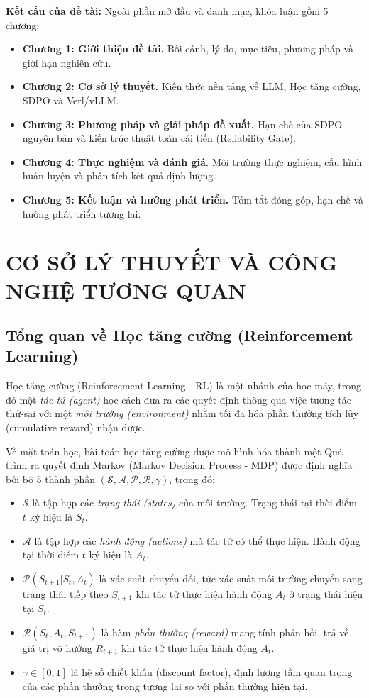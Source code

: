 \documentclass[12pt,a4paper]{report}
\begin{document}
\textbf{Kết cấu của đề tài:}
Ngoài phần mở đầu và danh mục, khóa luận gồm 5 chương:
\begin{itemize}
    \item \textbf{Chương 1: Giới thiệu đề tài.} Bối cảnh, lý do, mục tiêu, phương pháp và giới hạn nghiên cứu.
    \item \textbf{Chương 2: Cơ sở lý thuyết.} Kiến thức nền tảng về LLM, Học tăng cường, SDPO và Verl/vLLM.
    \item \textbf{Chương 3: Phương pháp và giải pháp đề xuất.} Hạn chế của SDPO nguyên bản và kiến trúc thuật toán cải tiến (Reliability Gate).
    \item \textbf{Chương 4: Thực nghiệm và đánh giá.} Môi trường thực nghiệm, cấu hình huấn luyện và phân tích kết quả định lượng.
    \item \textbf{Chương 5: Kết luận và hướng phát triển.} Tóm tắt đóng góp, hạn chế và hướng phát triển tương lai.
\end{itemize}

\chapter{CƠ SỞ LÝ THUYẾT VÀ CÔNG NGHỆ TƯƠNG QUAN}

\section{Tổng quan về Học tăng cường (Reinforcement Learning)}
Học tăng cường (Reinforcement Learning - RL) là một nhánh của học máy, trong đó một \textit{tác tử (agent)} học cách đưa ra các quyết định thông qua việc tương tác thử-sai với một \textit{môi trường (environment)} nhằm tối đa hóa phần thưởng tích lũy (cumulative reward) nhận được. 

Về mặt toán học, bài toán học tăng cường được mô hình hóa thành một Quá trình ra quyết định Markov (Markov Decision Process - MDP) được định nghĩa bởi bộ 5 thành phần $(\mathcal{S}, \mathcal{A}, \mathcal{P}, \mathcal{R}, \gamma)$, trong đó:
\begin{itemize}
    \item $\mathcal{S}$ là tập hợp các \textit{trạng thái (states)} của môi trường. Trạng thái tại thời điểm $t$ ký hiệu là $S_t$.
    \item $\mathcal{A}$ là tập hợp các \textit{hành động (actions)} mà tác tử có thể thực hiện. Hành động tại thời điểm $t$ ký hiệu là $A_t$.
    \item $\mathcal{P}(S_{t+1}|S_t, A_t)$ là xác suất chuyển đổi, tức xác suất môi trường chuyển sang trạng thái tiếp theo $S_{t+1}$ khi tác tử thực hiện hành động $A_t$ ở trạng thái hiện tại $S_t$.
    \item $\mathcal{R}(S_t, A_t, S_{t+1})$ là hàm \textit{phần thưởng (reward)} mang tính phản hồi, trả về giá trị vô hướng $R_{t+1}$ khi tác tử thực hiện hành động $A_t$.
    \item $\gamma \in [0, 1]$ là hệ số chiết khấu (discount factor), định lượng tầm quan trọng của các phần thưởng trong tương lai so với phần thưởng hiện tại.
\end{itemize}
\end{document}
